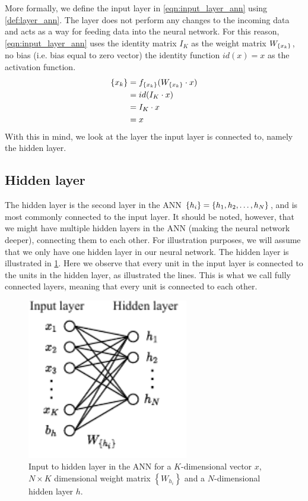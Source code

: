 More formally, we define the input layer in \cref{eqn:input_layer_ann} using \cref{def:layer_ann}. The layer does not perform any changes to the incoming data and acts as a way for feeding data into the neural network. For this reason, \cref{eqn:input_layer_ann} uses the identity matrix $I_K$ as the weight matrix $W_{\left\{ {x}_{k} \right\}}$, no bias (i.e. bias equal to zero vector) the identity function $id(x)=x$ as the activation function.
\begin{align}
    \label{eqn:input_layer_ann}
    \left\{ {x}_{k} \right\}
    &= f_{\left\{ {x}_{k} \right\}}(W_{\left\{ {x}_{k} \right\}} \cdot x) \\
    &= id(I_K \cdot x) \\
    &= I_K \cdot x \\
    &= x
\end{align}
With this in mind, we look at the layer the input layer is connected to, namely the hidden layer.

\subsection{Hidden layer}
The hidden layer is the second layer in the ANN $\left\{ {h}_{i} \right\} = \left\{ h_1, h_2, \ldots, h_N \right\}$, and is most commonly connected to the input layer. It should be noted, however, that we might have multiple hidden layers in the ANN (making the neural network deeper), connecting them to each other. For illustration purposes, we will assume that we only have one hidden layer in our neural network. The hidden layer is illustrated in \cref{fig:hidden_layer_ann}. Here we observe that every unit in the input layer is connected to the units in the hidden layer, as illustrated the lines. This is what we call fully connected layers, meaning that every unit is connected to each other.

\begin{figure}[H]
    \centering
    \includegraphics[height=7cm]{thesis/figures/artificial-neural-network-input-hidden-layer_cropped.pdf}
    \caption{Input to hidden layer in the ANN for a $K$-dimensional vector $x$, $N\times K$ dimensional weight matrix $\left\{ W_{h_i} \right\}$ and a $N$-dimensional hidden layer $h$.}
    \label{fig:hidden_layer_ann}
\end{figure}


